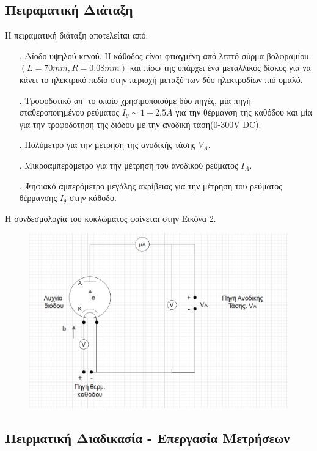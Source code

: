 \documentclass[a4paper]{article}
\begin{document}
\subsection*{Πειραματική Διάταξη }
H πειραματική διάταξη αποτελείται από: 
\begin{itemize}
\item[.] Δίοδο υψηλού κενού. Η κάθοδος είναι φτιαγμένη από λεπτό σύρμα βολφραμίου $(L=70mm,R=0.08mm)$ και πίσω της υπάρχει ένα μεταλλικός δίσκος για να κάνει το ηλεκτρικό πεδίο στην περιοχή μεταξύ των δύο ηλεκτροδίων πιό ομαλό.
\item[.] Τροφοδοτικό απ' το οποίο χρησιμοποιούμε δύο πηγές, μία πηγή σταθεροποιημένου ρεύματος $I_\theta\sim 1-2.5A$ για την θέρμανση της καθόδου και μία για την τροφοδότηση της διόδου με την ανοδική τάση(0-300V DC).
\item[.] Πολύμετρο για την μέτρηση της ανοδικής τάσης $V_A$.
\item[.] Μικροαμπερόμετρο για την μέτρηση του ανοδικού ρεύματος $I_A$.
\item[.] Ψηφιακό αμπερόμετρο μεγάλης ακρίβειας για την μέτρηση του ρεύματος θέρμανσης $I_\theta$ στην κάθοδο.
\end{itemize}
Η συνδεσμολογία του κυκλώματος φαίνεται στην Εικόνα 2.
\begin{figure}[h!]
\centering
\caption{ }
\includegraphics[scale=0.4]{circuit.png}
\end{figure}

\subsection*{Πειρματική Διαδικασία - Επεργασία Μετρήσεων}
\end{document}
